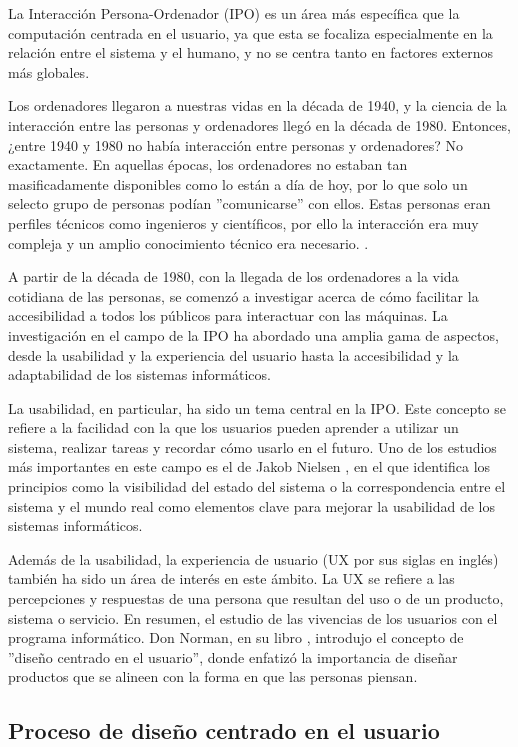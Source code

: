 La Interacción Persona-Ordenador (IPO) es un área más específica que la computación centrada en el usuario, ya que esta se focaliza especialmente en la relación entre el sistema y el humano, y no se centra tanto en factores externos más globales.

Los ordenadores llegaron a nuestras vidas en la década de 1940, y la ciencia de la interacción entre las personas y ordenadores llegó en la década de 1980. Entonces, ¿entre 1940 y 1980 no había interacción entre personas y ordenadores? No exactamente. En aquellas épocas, los ordenadores no estaban tan masificadamente disponibles como lo están a día de hoy, por lo que solo un selecto grupo de personas podían ''comunicarse'' con ellos. Estas personas eran perfiles técnicos como ingenieros y científicos, por ello la interacción era muy compleja y un amplio conocimiento técnico era necesario. \citep{mackenzie2012human}.

A partir de la década de 1980, con la llegada de los ordenadores a la vida cotidiana de las personas, se comenzó a investigar acerca de cómo facilitar la accesibilidad a todos los públicos para interactuar con las máquinas.  La investigación en el campo de la IPO ha abordado una amplia gama de aspectos, desde la usabilidad y la experiencia del usuario hasta la accesibilidad y la adaptabilidad de los sistemas informáticos.

La usabilidad, en particular, ha sido un tema central en la IPO. Este concepto se refiere a la facilidad con la que los usuarios pueden aprender a utilizar un sistema, realizar tareas y recordar cómo usarlo en el futuro. Uno de los estudios más importantes en este campo es el de Jakob Nielsen \cite{nielsen1994usability}, en el que identifica los principios como la visibilidad del estado del sistema o la correspondencia entre el sistema y el mundo real como elementos clave para mejorar la usabilidad de los sistemas informáticos.

Además de la usabilidad, la experiencia de usuario (UX por sus siglas en inglés) también ha sido un área de interés en este ámbito. La UX se refiere a las percepciones y respuestas de una persona que resultan del uso o de un producto, sistema o servicio. En resumen, el estudio de las vivencias de los usuarios con el programa informático. Don Norman, en su libro \cite{norman2013design}, introdujo el concepto de ''diseño centrado en el usuario'', donde enfatizó la importancia de diseñar productos que se alineen con la forma en que las personas piensan.

\subsection{Proceso de diseño centrado en el usuario}

